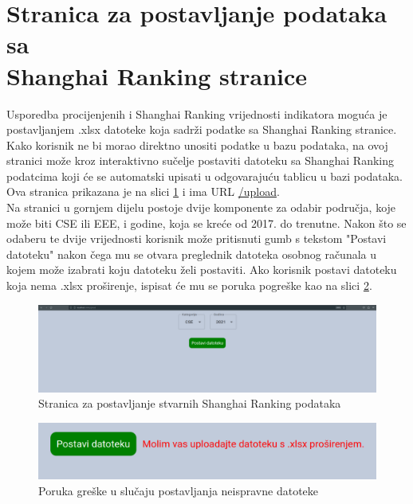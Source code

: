 \documentclass[times, utf8, zavrsni]{fer}
\begin{document}
\section{Stranica za postavljanje podataka sa \\Shanghai Ranking stranice}
Usporedba procijenjenih i Shanghai Ranking vrijednosti indikatora moguća je \\postavljanjem .xlsx datoteke koja sadrži 
podatke sa Shanghai Ranking stranice. Kako korisnik ne bi morao direktno unositi podatke u bazu podataka, na ovoj stranici može kroz 
interaktivno sučelje postaviti datoteku sa Shanghai Ranking podatcima koji će se automatski upisati u odgovarajuću tablicu u bazi podataka.
\\Ova stranica prikazana je na slici \ref{fig:upload} i ima URL \url{/upload}.
\\Na stranici u gornjem dijelu postoje dvije komponente za odabir područja, koje može biti CSE ili EEE, i godine, koja se kreće od 2017. do trenutne. Nakon što 
se odaberu te dvije vrijednosti korisnik može pritisnuti gumb s tekstom "Postavi datoteku" nakon čega mu se otvara preglednik datoteka osobnog računala
u kojem može izabrati koju datoteku želi postaviti. Ako korisnik postavi datoteku koja nema .xlsx proširenje, ispisat će mu se poruka pogreške kao na 
slici \ref{fig:error}.
\begin{figure}[htb]
    \hspace*{-2cm}  
       \includegraphics[scale=0.2]{upload.png} 
       \caption{Stranica za postavljanje stvarnih Shanghai Ranking podataka}
       \label{fig:upload}
       \end{figure} 
 \begin{figure}[htb]
        \centering
           \includegraphics[scale=0.2]{error.png} 
           \caption{Poruka greške u slučaju postavljanja neispravne datoteke}
           \label{fig:error}
           \end{figure}        
\end{document}

